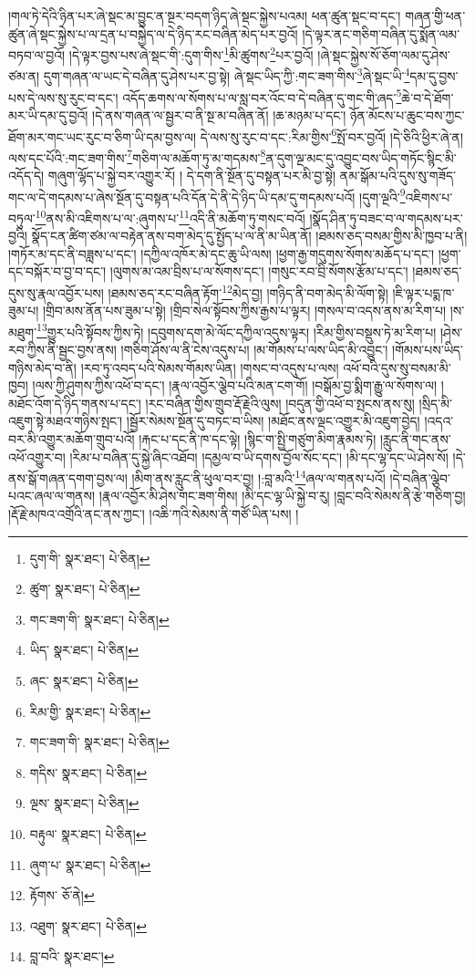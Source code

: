 །གལ་ཏེ་དེའི་ཉིན་པར་ཞེ་སྡང་མ་བྱུང་ན་སྔར་བདག་ཉིད་ཞེ་སྡང་སྐྱེས་པའམ། ཕན་ཚུན་སྡང་བ་དང་། གཞན་གྱི་ཕན་ཚུན་ཞེ་སྡང་སྐྱེས་པ་ལ་དྲན་པ་བསྐྱེད་ལ་དེ་ཉིད་རང་བཞིན་མེད་པར་བྱའོ། །དེ་ལྟར་ནང་གཅིག་བཞིན་དུ་སྨོན་ལམ་བཏབ་ལ་བྱའོ། །དེ་ལྟར་བྱས་པས་ཞེ་སྡང་གི་:དུག་གིས་\footnote{དུག་གི་  སྣར་ཐང་།  པེ་ཅིན། }མི་ཚུགས་\footnote{ཚུག་  སྣར་ཐང་།  པེ་ཅིན། }པར་བྱའོ། །ཞེ་སྡང་སྐྱེས་སོ་ཅོག་ལམ་དུ་ཤེས་ཙམ་ན། དུག་གཞན་ལ་ཡང་དེ་བཞིན་དུ་ཤེས་པར་བྱ་སྟེ། ཞེ་སྡང་ཡིད་ཀྱི་:གང་ཟག་གིས་\footnote{གང་ཟག་གི་  སྣར་ཐང་།  པེ་ཅིན། }ཞེ་སྡང་ཡི་\footnote{ཡིད་  སྣར་ཐང་།  པེ་ཅིན། }དམ་དུ་བྱས་པས་དེ་ལས་སུ་རུང་བ་དང་། འདོད་ཆགས་ལ་སོགས་པ་ལ་སླ་བར་འོང་བ་དེ་བཞིན་དུ་གང་གི་ཞད་\footnote{ཞང་  སྣར་ཐང་།  པེ་ཅིན། }ཆེ་བ་དེ་ཐོག་མར་ཡི་དམ་དུ་བྱའོ། །དེ་ནས་གཞན་ལ་སྦྱར་བ་ནི་སྔ་མ་བཞིན་ནོ། །ཆ་མཉམ་པ་དང་། ཉོན་མོངས་པ་ཆུང་བས་ཀྱང་ཐོག་མར་གང་ཡང་རུང་བ་ཅིག་ཡི་དམ་བྱས་ལ། དེ་ལས་སུ་རུང་བ་དང་:རིམ་གྱིས་\footnote{རིམ་གྱི་  སྣར་ཐང་།  པེ་ཅིན། }སྤོ་བར་བྱའོ། །དེ་ཅིའི་ཕྱིར་ཞེ་ན། ལས་དང་པོའི་:གང་ཟག་གིས་\footnote{གང་ཟག་གི་  སྣར་ཐང་།  པེ་ཅིན། }གཅིག་ལ་མཆོག་ཏུ་མ་གདམས་\footnote{གདིས་  སྣར་ཐང་།  པེ་ཅིན། }ན་དུག་ལྔ་མང་དུ་འབྱུང་བས་ཡིད་གཏོང་སྙིང་མི་འདོད་དེ། གཞུག་ལྷོད་པ་སྐྱེ་བར་འགྱུར་རོ། །
དེ་དག་ནི་སྔོན་དུ་བསྟན་པར་མི་བྱ་སྟེ། ནམ་སྒོམ་པའི་དུས་སུ་གཟོད་གང་ལ་དེ་གདམས་པ་ཞེས་སྔོན་དུ་བསྟན་པའི་དོན་དེ་ནི་དེ་ཉིད་ཡི་དམ་དུ་གདམས་པའོ། །དུག་ལྔའི་\footnote{ལྔས་  སྣར་ཐང་།  པེ་ཅིན། }འཇིགས་པ་བཏུལ་\footnote{བརྟུལ་  སྣར་ཐང་།  པེ་ཅིན། }ནས་མི་འཇིགས་པ་ལ་:ཞུགས་པ་\footnote{ཞུག་པ་  སྣར་ཐང་།  པེ་ཅིན། }འདི་ནི་མཆོག་ཏུ་གསང་བའོ། །སྣོད་ཤིན་ཏུ་བཟང་བ་ལ་གདམས་པར་བྱའི། སྣོད་ངན་ཚིག་ཙམ་ལ་བརྟེན་ནས་བག་མེད་དུ་སྤྱོད་པ་ལ་ནི་མ་ཡིན་ནོ། །ཐམས་ཅད་བསམ་གྱིས་མི་ཁྱབ་པ་ནི། །གཏོར་མ་དང་ནི་བཟླས་པ་དང་། །དཀྱིལ་འཁོར་མེ་དང་ཆུ་ཡི་ལས། །ཕྱག་རྒྱ་གདུགས་སོགས་མཆོད་པ་དང་། །ཕྱག་དང་བསྐོར་བ་བྱ་བ་དང་། །ལུགས་མ་འམ་བྲིས་པ་ལ་སོགས་དང་། །གསུང་རབ་བྲི་སོགས་རྩོམ་པ་དང་། །ཐམས་ཅད་དུས་སུ་རྣལ་འབྱོར་པས། །ཐམས་ཅད་རང་བཞིན་རྟོག་\footnote{རྟོགས་  ཅོ་ནེ། }མེད་བྱ། །གཉིད་ནི་བག་མེད་མི་ལོག་སྟེ། །ཇི་ལྟར་པདྨ་ཁ་ཟུམ་པ། །གྲིབ་མས་ནོན་པས་ཟུམ་པ་སྟེ། །གྲིབ་སེལ་སྟོབས་ཀྱིས་རྒྱས་པ་ལྟར། །གསལ་བ་འདས་ནས་མ་རིག་པ། །ས་མཐུག་\footnote{འཐུག་  སྣར་ཐང་།  པེ་ཅིན། }གྱུར་པའི་སྟོབས་ཀྱིས་ཏེ། །དབུགས་དག་མེ་ལོང་དཀྱིལ་འདུས་ལྟར། །རིམ་གྱིས་བསྡུས་ཏེ་མ་རིག་པ། །ཤེས་རབ་ཀྱིས་ནི་སྦྱང་བྱས་ནས། །གཅིག་ཤོས་ལ་ནི་ངེས་འདུས་པ། །མ་གོམས་པ་ལས་ཡིད་མི་འབྱུང་། །གོམས་པས་ཡིད་གཉིས་མེད་བ་ནི། །རབ་ཏུ་འབད་པའི་སེམས་གོམས་ཡིན། །གསང་བ་འདུས་པ་ལས། འཕོ་བའི་དུས་སུ་བསམ་མི་ཁྱབ། །ལས་ཀྱི་ཤུགས་ཀྱིས་འཕོ་བ་དང་། །རྣལ་འབྱོར་ལྕེབ་པའི་མན་ངག་གོ། །བསྒོམ་བྱ་སྨིག་རྒྱུ་ལ་སོགས་ལ། །མཐོང་འོག་དེ་ཉིད་གནས་པ་དང་། །རང་བཞིན་གྱིས་གྲུབ་རྡོ་རྗེའི་ལུས། །བདུན་གྱི་འཕོ་བ་སྤངས་ནས་སུ། །སྲིད་མི་འཇུག་སྟེ་མཐའ་གཉིས་སྤང་། །སྦྱོར་སེམས་སྔོན་དུ་བཏང་བ་ཡིས། །མཐོང་ནས་ལྡང་འགྱུར་མི་འཇུག་བྱེད། །འདའ་བར་མི་འགྱུར་མཆོག་གྲུབ་པའོ། །རྐང་པ་དང་ནི་ཁ་དང་ལྟེ། །སྙིང་ག་སྤྱི་གཙུག་མིག་རྣམས་ཏེ། །རླུང་ནི་གང་ནས་འཕོ་འགྱུར་བ། །རིམ་པ་བཞིན་དུ་སྐྱེ་ཞིང་འཐོབ། །དམྱལ་བ་ཡི་དགས་བྱོལ་སོང་དང་། །མི་དང་ལྷ་དང་ཡེ་ཤེས་སོ། །དེ་ནས་སྒོ་གཞན་དགག་བྱས་ལ། །མིག་ནས་རླུང་ནི་ཕུལ་བར་བྱ། །:བླ་མའི་\footnote{བླ་བའི་  སྣར་ཐང་། }ཞལ་ལ་གནས་པའོ། །དེ་བཞིན་ལྕེབ་པའང་ཞལ་ལ་གནས། །རྣལ་འབྱོར་མི་ཤེས་གང་ཟག་གིས། །མི་དང་ལྷ་ཡི་སྐྱེ་བ་རུ། །བླང་བའི་སེམས་ནི་རྩེ་གཅིག་བྱ། །རྡོ་རྗེ་མཁའ་འགྲོའི་ནང་ནས་ཀྱང་། །འཆི་ཀའི་སེམས་ནི་གཙོ་ཡིན་པས། །
